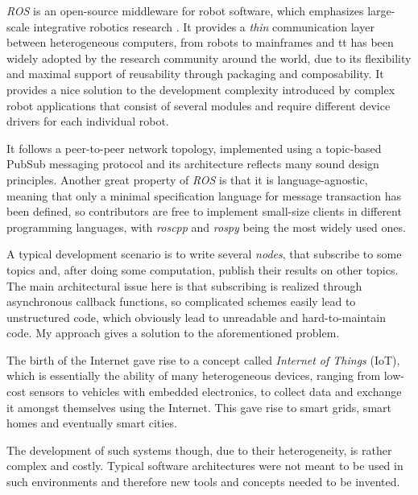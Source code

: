 \documentclass{dithesis}
\begin{document}


\textit{ROS} is an open-source middleware for robot software, which emphasizes large-scale integrative robotics research \cite{ROS}. It provides a \textit{thin} communication layer between heterogeneous computers, from robots to mainframes and tt has been widely adopted by the research community around the world, due to its flexibility and maximal support of reusability through packaging and composability. It provides a nice solution to the development complexity introduced by complex robot applications that consist of several modules and require different device drivers for each individual robot. 

It follows a peer-to-peer network topology, implemented using a topic-based PubSub messaging protocol and its architecture reflects many sound design principles. Another great property of \textit{ROS} is that it is language-agnostic, meaning that only a minimal specification language for message transaction has been defined, so contributors are free to implement small-size clients in different programming languages, with \textit{roscpp} and \textit{rospy} being the most widely used ones.

A typical development scenario is to write several \textit{nodes}, that subscribe to some topics and, after doing some computation, publish their results on other topics. The main architectural issue here is that subscribing is realized through asynchronous callback functions, so complicated schemes easily lead to unstructured code, which obviously lead to unreadable and hard-to-maintain code. My approach gives a solution to the aforementioned problem.
 

The birth of the Internet gave rise to a concept called \textit{Internet of Things} (IoT), which is essentially the ability of many heterogeneous devices, ranging from low-cost sensors to vehicles with embedded electronics, to collect data and exchange it amongst themselves using the Internet. This gave rise to smart grids, smart homes and eventually smart cities. 

The development of such systems though, due to their heterogeneity, is rather complex and costly. Typical software architectures were not meant to be used in such environments and therefore new tools and concepts needed to be invented. 
\end{document}
